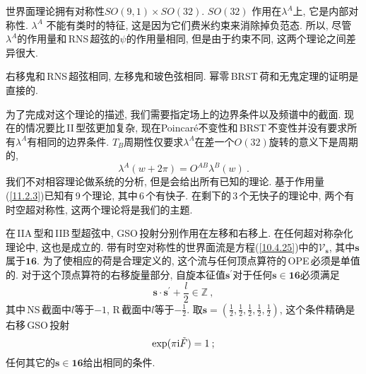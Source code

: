 世界面理论拥有对称性$ SO(9,1)\times SO(32)$. $SO(32)$ 作用在$ \lambda^{A} $上, 它是内部对称性. $\lambda^{A}$ 不能有类时的特征, 这是因为它们费米约束来消除掉负范态. 所以, 尽管$ \lambda^{A} $的作用量和\,RNS\,超弦的$ \psi $的作用量相同, 但是由于约束不同, 这两个理论之间差异很大.

右移鬼和\,RNS\,超弦相同, 左移鬼和玻色弦相同. 幂零\,BRST\,荷和无鬼定理的证明是直接的. 

为了完成对这个理论的描述, 我们需要指定场上的边界条件以及频谱中的截面. 现在的情况要比\,II\,型弦更加复杂, 现在Poincar\'{e}不变性和\,BRST\,不变性并没有要求所有$ \lambda^{A} $有相同的边界条件. $T_{B} $周期性仅要求$ \lambda^{A} $在差一个$O(32)$旋转的意义下是周期的,
\begin{equation}
    \lambda^{A}(w+2\pi) = O^{AB}\lambda^{B}(w) \:. \label{11.2.6} 
\end{equation}
我们不对相容理论做系统的分析, 但是会给出所有已知的理论. 基于作用量(\ref{11.2.3})已知有\,9\,个理论, 其中\,6\,个有快子. 在剩下的\,3\,个无快子的理论中, 两个有时空超对称性, 这两个理论将是我们的主题.

在\,IIA\,型和\,IIB\,型超弦中, GSO\,投射分别作用在左移和右移上. 在任何超对称杂化理论中, 这也是成立的. 带有时空对称性的世界面流是方程(\ref{10.4.25})中的$ \mathscr{V}_{\mathbf{s}}$, 其中$ \mathbf{s} $属于$ \mathbf{16}$. 为了使相应的荷是合理定义的, 这个流与任何顶点算符的\,OPE\,必须是单值的. 对于这个顶点算符的右移旋量部分, 自旋本征值$ \mathbf{s}^{\prime} $对于任何$ \mathbf{s}\in\mathbf{16} $必须满足
\begin{equation}
    \mathbf{s}\cdot \mathbf{s}^{\prime} + \frac{l}{2} \in \mathds{Z} \:, \label{11.2.7}
\end{equation}
其中\,NS\,截面中$ l $等于$ -1$, R\,截面中$ l $等于$ -\frac{1}{2}$. 取$ \mathbf{s}=(\frac{1}{2},\frac{1}{2},\frac{1}{2},\frac{1}{2},\frac{1}{2})$, 这个条件精确是右移\,GSO\,投射
\begin{equation}
    \exp(\pi\mathrm{i}\tilde{F})=1\: ; \label{11.2.8}
\end{equation}
任何其它的$ \mathbf{s}\in\mathbf{16} $给出相同的条件.

